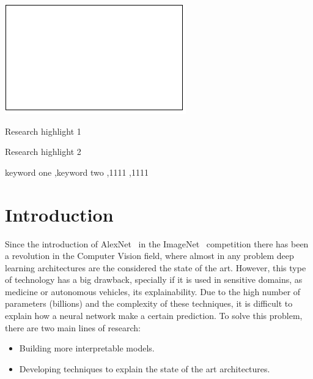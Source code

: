 \documentclass[preprint,12pt]{elsarticle}
\begin{document}
\begin{frontmatter}
\begin{graphicalabstract}
\includegraphics{grabs}
\end{graphicalabstract}

\begin{highlights}
\item Research highlight 1
\item Research highlight 2
\end{highlights}

\begin{keyword}
keyword one \sep keyword two
 \sep 1111
 \sep 1111
\end{keyword}

\end{frontmatter}


\section{Introduction}
\label{sec:introduction}
Since the introduction of AlexNet~\cite{krizhevskyImageNetClassificationDeep2012} in the ImageNet~\cite{ImageNet} competition there has been a revolution in the Computer Vision field, where almost in any problem deep learning architectures are the considered the state of the art. However, this type of technology has a big drawback, specially if it is used in sensitive domains, as medicine or autonomous vehicles, its explainability. Due to the high number of parameters (billions) and the complexity of these techniques, it is difficult to explain how a neural network make a certain prediction. To solve this problem, there are two main lines of research:

\begin{itemize}
    \item Building more interpretable models.
    \item Developing techniques to explain the state of the art architectures.
\end{itemize}
\end{document}
